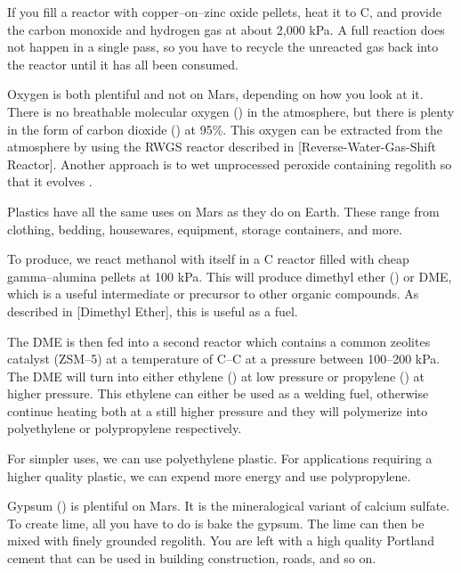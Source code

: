 If you fill a reactor with copper--on--zinc oxide pellets, heat it to C, and provide the carbon monoxide and hydrogen gas at about 2,000 kPa. A full reaction does not happen in a single pass, so you have to recycle the unreacted gas back into the reactor until it has all been consumed.

Oxygen is both plentiful and not on Mars, depending on how you look at it. There is no breathable molecular oxygen () in the atmosphere, but there is plenty in the form of carbon dioxide () at 95\%. This oxygen can be extracted from the atmosphere by using the RWGS reactor described in [Reverse-Water-Gas-Shift Reactor]. Another approach is to wet unprocessed peroxide containing regolith so that it evolves .

Plastics have all the same uses on Mars as they do on Earth. These range from clothing, bedding, housewares, equipment, storage containers, and more.

To produce, we react methanol with itself in a C reactor filled with cheap gamma--alumina pellets at 100 kPa. This will produce dimethyl ether () or DME, which is a useful intermediate or precursor to other organic compounds. As described in [Dimethyl Ether], this is useful as a fuel.

The DME is then fed into a second reactor which contains a common zeolites catalyst (ZSM--5) at a temperature of C--C at a pressure between 100--200 kPa. The DME will turn into either ethylene () at low pressure or propylene () at higher pressure. This ethylene can either be used as a welding fuel, otherwise continue heating both at a still higher pressure and they will polymerize into polyethylene or polypropylene respectively.

For simpler uses, we can use polyethylene plastic. For applications requiring a higher quality plastic, we can expend more energy and use polypropylene.


Gypsum () is plentiful on Mars. It is the mineralogical variant of calcium sulfate. To create lime, all you have to do is bake the gypsum. The lime can then be mixed with finely grounded regolith. You are left with a high quality Portland cement that can be used in building construction, roads, and so on.

